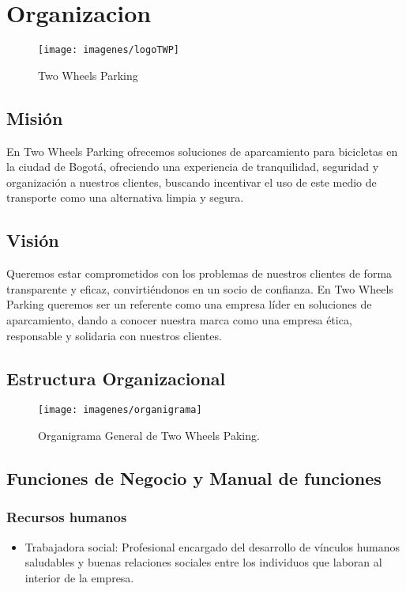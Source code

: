 \chapter{Organizacion}

\begin{figure}[H]
	\centering
	\texttt{[image: imagenes/logoTWP]}
	\caption{Two Wheels Parking}
	\label{fig:logotwp}
\end{figure}


\section{Misión}
En Two Wheels Parking ofrecemos soluciones de aparcamiento para bicicletas en la ciudad de Bogotá, ofreciendo una experiencia de tranquilidad, seguridad y organización a nuestros clientes,  buscando incentivar el uso de este medio de transporte como una alternativa limpia y segura.\\

\section{Visión}
Queremos estar comprometidos con los problemas de nuestros clientes de forma transparente y eficaz, convirtiéndonos en un socio de confianza. En Two Wheels Parking queremos ser un referente como una empresa líder en soluciones de aparcamiento, dando a conocer nuestra marca como una empresa ética, responsable y solidaria con nuestros clientes.\\

\section{Estructura Organizacional}
\begin{figure}[H]
	\centering
	\texttt{[image: imagenes/organigrama]}
	\caption{Organigrama General de Two Wheels Paking.}
	\label{fig:organigrama}
\end{figure}

\section{Funciones de Negocio y Manual de funciones}

\subsection {Recursos humanos}
\begin{itemize}
	\item Trabajadora social: Profesional encargado del desarrollo de vínculos humanos saludables y buenas relaciones sociales entre los individuos que laboran al interior de la empresa.\\
\end{itemize}


